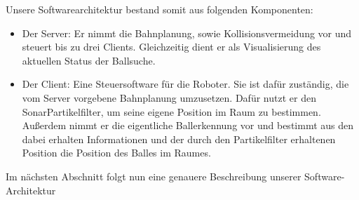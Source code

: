 Unsere Softwarearchitektur bestand somit aus folgenden Komponenten:
\begin{itemize}
\item Der Server: Er nimmt die Bahnplanung, sowie Kollisionsvermeidung
  vor und steuert bis zu drei Clients. Gleichzeitig dient er als
  Visualisierung des aktuellen Status der Ballsuche.
\item Der Client: Eine Steuersoftware für die Roboter. Sie ist dafür
  zuständig, die vom Server vorgebene Bahnplanung umzusetzen. Dafür
  nutzt er den SonarPartikelfilter, um seine eigene Position im Raum
  zu bestimmen. Außerdem nimmt er die eigentliche Ballerkennung vor
  und bestimmt aus den dabei erhalten Informationen und der durch den
  Partikelfilter erhaltenen Position die Position des Balles im Raumes.
\end{itemize}
Im nächsten Abschnitt folgt nun eine genauere Beschreibung unserer Software-Architektur
